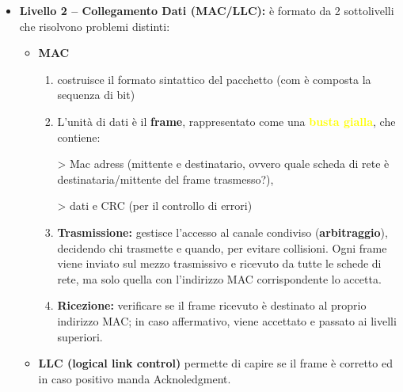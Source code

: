 \documentclass[a4paper,12pt]{report}
\begin{document}
\begin{itemize}
\begin{itemize}
    \item Si occupa anche della \textbf{frammentazione dei pacchetti}, ma \textbf{solo in IPv4} (in IPv6 la frammentazione non è più gestita dal router, ma dall’host sorgente).
    
    \item L’unità di dati è il \textbf{pacchetto}, rappresentato come una \textbf{\textcolor{orange}{busta arancione}}.
    \item \textit{Esempi di protocolli:} IP, ICMP, OSPF, BGP.
    \item \textit{Dispositivi tipici:} router.
    \end{itemize}
  
    \newpage
        \item \textbf{Livello 2 – Collegamento Dati (MAC/LLC):} 
        è formato da 2 sottolivelli che risolvono problemi distinti:
        \begin{itemize}
            \item \textbf{MAC}
            \begin{enumerate}
                \item costruisce il formato sintattico del pacchetto (com è composta la sequenza di bit)
                \item  L’unità di dati è il \textbf{frame}, rappresentato come una \textbf{\textcolor{yellow}{busta gialla}}, che contiene: 
                
                > Mac adress (mittente e destinatario, ovvero quale scheda di rete è destinataria/mittente del frame trasmesso?),
                
                > dati e CRC (per il controllo di errori)

                \item \textbf{Trasmissione:} gestisce l’accesso al canale condiviso (\textbf{arbitraggio}), decidendo chi trasmette e quando, per evitare collisioni.  
                Ogni frame viene inviato sul mezzo trasmissivo e ricevuto da tutte le schede di rete, ma solo quella con l’indirizzo MAC corrispondente lo accetta.

                \item \textbf{Ricezione:} verificare se il frame ricevuto è destinato al proprio indirizzo MAC; in caso affermativo, viene accettato e passato ai livelli superiori.
            \end{enumerate}
            
            \item \textbf{LLC (logical link control)}
            permette di capire se il frame è corretto ed in caso positivo manda Acknoledgment.


\end{itemize}
\end{itemize}
\end{document}
